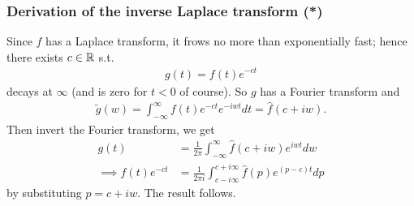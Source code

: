 \documentclass[a4paper]{article}
\begin{document}
\subsubsection{Derivation of the inverse Laplace transform (*)}

Since $f$ has a Laplace transform, it frows no more than exponentially fast; hence there exists $c \in \mathbb{R}$ s.t. 
\begin{equation*}
\begin{aligned}
g(t) = f(t) e^{-ct}
\end{aligned}
\end{equation*}
decays at $\infty$ (and is zero for $t<0$ of course). So $g$ has a Fourier transform and
\begin{equation*}
\begin{aligned}
\tilde{g}(w) = \int_{-\infty}^\infty f(t) e^{-ct} e^{-iwt} dt = \hat{f}(c+iw).
\end{aligned}
\end{equation*}
Then invert the Fourier transform, we get
\begin{equation*}
\begin{aligned}
g(t) &= \frac{1}{2\pi} \int_{-\infty}^\infty \hat{f}(c+iw) e^{iwt} dw
\\ \implies f(t) e^{-ct} &= \frac{1}{2\pi i} \int_{c-i\infty}^{c+i\infty} \hat{f}(p) e^{(p-c)t} dp 
\end{aligned}
\end{equation*}
by substituting $p=c+iw$. The result follows.
\end{document}
